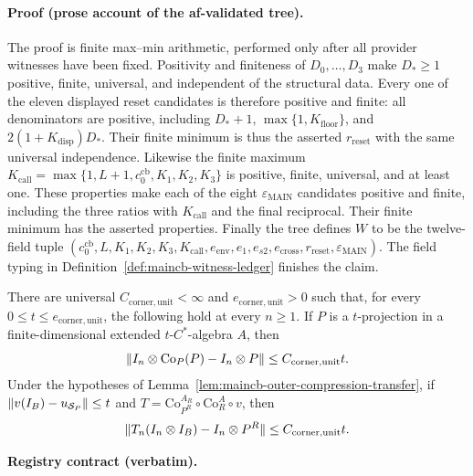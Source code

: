 \paragraph{Proof (prose account of the af-validated tree).}
The proof is finite max--min arithmetic, performed only after all provider witnesses
have been fixed.  Positivity and finiteness of $D_0,\ldots,D_3$ make
$D_*\ge1$ positive, finite, universal, and independent of the structural data.
Every one of the eleven displayed reset candidates is therefore positive and finite:
all denominators are positive, including $D_*+1$, $\max\{1,K_{\mathrm{floor}}\}$,
and $2(1+K_{\mathrm{disp}})D_*$.  Their finite minimum is thus the asserted
$r_{\mathrm{reset}}$ with the same universal independence.  Likewise the finite maximum
$K_{\mathrm{call}}=\max\{1,L+1,c_0^{\mathrm{cb}},K_1,K_2,K_3\}$ is positive,
finite, universal, and at least one.  These properties make each of the eight
$\varepsilon_{\mathrm{MAIN}}$ candidates positive and finite, including the three
ratios with $K_{\mathrm{call}}$ and the final reciprocal.  Their finite minimum has
the asserted properties.  Finally the tree defines $W$ to be the twelve-field tuple
$(c_0^{\mathrm{cb}},L,K_1,K_2,K_3,K_{\mathrm{call}},e_{\mathrm{env}},e_1,e_{s2},
e_{\mathrm{cross}},r_{\mathrm{reset}},\varepsilon_{\mathrm{MAIN}})$.
The field typing in Definition~\ref{def:maincb-witness-ledger} finishes the claim.

\begin{lemma}\label{lem:maincb-compressed-corner-unit-comparison}
There are universal $C_{\mathrm{corner,unit}}<\infty$ and $e_{\mathrm{corner,unit}}>0$
such that, for every $0\le t\le e_{\mathrm{corner,unit}}$, the following hold at every $n\ge1$.
If $P$ is a $t$-projection in a finite-dimensional extended $t$-$C^*$-algebra $A$, then
\[
 \lVert I_n\otimes\mathrm{Co}_P(P)-I_n\otimes P\rVert\le C_{\mathrm{corner,unit}}t.
\]
Under the hypotheses of Lemma~\ref{lem:maincb-outer-compression-transfer}, if
$\lVert v(I_B)-u_{\mathcal S_P}\rVert\le t$ and
$T=\mathrm{Co}^{A_R}_{P^R}\circ\mathrm{Co}^{A}_{R}\circ v$, then
\[
 \lVert T_n(I_n\otimes I_B)-I_n\otimes P^R\rVert\le C_{\mathrm{corner,unit}}t.
\]
\end{lemma}
\noindent\textbf{Registry contract (verbatim).}

